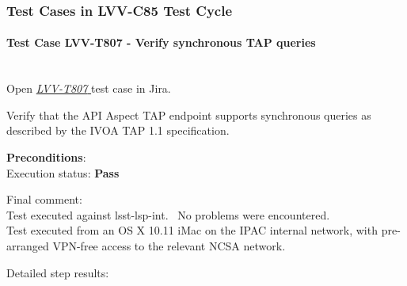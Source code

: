 \documentclass[DM,lsstdraft,STR,toc]{lsstdoc}
\begin{document}
  \subsubsection{Test Cases in LVV-C85 Test Cycle}


    \paragraph{Test Case LVV-T807 - Verify synchronous TAP queries
 }\mbox{}\\

Open  \href{https://jira.lsstcorp.org/secure/Tests.jspa#/testCase/LVV-T807}{\textit{ LVV-T807 } }
test case in Jira.

    Verify that the API Aspect TAP endpoint supports synchronous queries as
described by the IVOA TAP 1.1 specification. ~ ~


    \textbf{ Preconditions}:\\
    

    Execution status: {\bf Pass }

    Final comment:\\Test executed against lsst-lsp-int. ~No problems were encountered.\\
Test executed from an OS X 10.11 iMac on the IPAC internal network, with
pre-arranged VPN-free access to the relevant NCSA network.



    Detailed step results:
\end{document}

